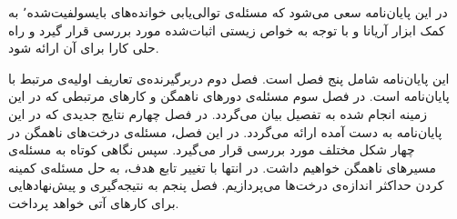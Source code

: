 
در این پایان‌نامه سعی می‌شود که مسئله‌ی توالی‌یابی خوانده‌های بایسولفیت‌شده٬ به کمک ابزار آریانا و با توجه به خواص زیستی اثبات‌شده مورد بررسی قرار گیرد و راه حلی کارا برای آن ارائه شود.


این پایان‌نامه شامل پنج فصل است. 
فصل دوم دربرگیرنده‌ی تعاریف اولیه‌ی مرتبط با پایان‌نامه است. 
در فصل سوم مسئله‌ی دورهای ناهمگن و کارهای مرتبطی که در این زمینه انجام شده به تفصیل بیان می‌گردد. 
در فصل چهارم نتایج جدیدی که در این پایان‌نامه به دست آمده ارائه می‌گردد. در این فصل، مسئله‌ی درخت‌های ناهمگن در چهار شکل مختلف مورد بررسی قرار می‌گیرد. سپس نگاهی کوتاه به مسئله‌ی مسیرهای ناهمگن خواهیم داشت. در انتها با تغییر تابع هدف، به حل مسئله‌ی کمینه کردن حداکثر اندازه‌ی درخت‌ها می‌پردازیم.
فصل پنجم به نتیجه‌گیری و پیش‌نهادهایی برای کارهای آتی خواهد پرداخت.
